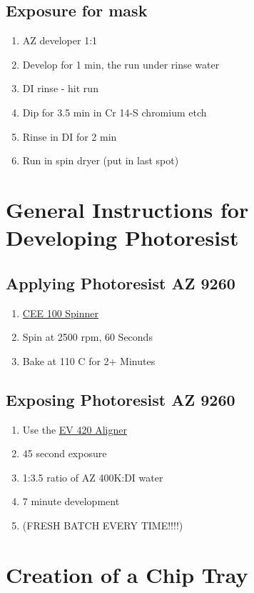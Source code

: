 \documentclass[12pt]{article}
\numberwithin{equation}{section}
\numberwithin{table}{section}
\numberwithin{figure}{section}
\begin{document}
\subsection{Exposure for mask}

\begin{enumerate}
\item AZ developer 1:1
\item Develop for 1 min, the run under rinse water
\item DI rinse - hit run
\item Dip for 3.5 min in Cr 14-S chromium etch
\item Rinse in DI for 2 min
\item Run in spin dryer (put in last spot)
\end{enumerate}
 
\section{General Instructions for Developing Photoresist}
 
\subsection{Applying Photoresist AZ 9260}
\begin{enumerate}
\item \href{https://coral.nanofab.utah.edu/lab/equipment/show_eq/CEE+100}{CEE 100 Spinner}
\item Spin at 2500 rpm, 60 Seconds
\item Bake at 110 C for 2+ Minutes
\end{enumerate}

\subsection{Exposing Photoresist AZ 9260}
\begin{enumerate}
\item Use the \href{https://coral.nanofab.utah.edu/lab/equipment/show_eq/EV+420}{EV 420 Aligner} 
\item 45 second exposure
\item 1:3.5 ratio of AZ 400K:DI water
\item 7 minute development
\item (FRESH BATCH EVERY TIME!!!!)
\end{enumerate}

\section{Creation of a Chip Tray} 
\end{document}
